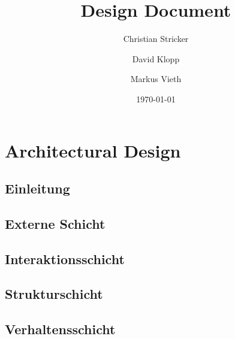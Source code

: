 \documentclass{book}
\title{Design Document}
\author{Christian Stricker \and David Klopp \and Markus Vieth}
\date{\today}
\begin{document}
\frontmatter
\maketitle
\tableofcontents
\mainmatter


\part{Architectural Design}

\chapter{Einleitung}
 
 
\chapter{Externe Schicht}


\chapter{Interaktionsschicht}


\chapter{Strukturschicht}


\chapter{Verhaltensschicht}


 
\end{document}
